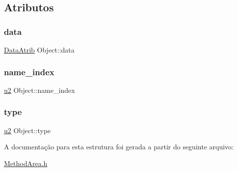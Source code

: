 \subsection{Atributos}
\mbox{\label{structObject_aea3a2d0f5d67e5b8e9259f02f2b744da}} 
\subsubsection{\texorpdfstring{data}{data}}
{\footnotesize\ttfamily \hyperlink{unionDataAtrib}{Data\+Atrib} Object\+::data}

\mbox{\label{structObject_a792741be5e389dce8261c75ada556006}} 
\subsubsection{\texorpdfstring{name\+\_\+index}{name\_index}}
{\footnotesize\ttfamily \hyperlink{ClassLoader_8h_a5f223212eef04d10a4550ded680cb1cf}{u2} Object\+::name\+\_\+index}

\mbox{\label{structObject_a0d3800016b59f53a98979f1c05a166f6}} 
\subsubsection{\texorpdfstring{type}{type}}
{\footnotesize\ttfamily \hyperlink{ClassLoader_8h_a5f223212eef04d10a4550ded680cb1cf}{u2} Object\+::type}



A documentação para esta estrutura foi gerada a partir do seguinte arquivo\+:\begin{DoxyCompactItemize}
\item 
\hyperlink{MethodArea_8h}{Method\+Area.\+h}\end{DoxyCompactItemize}
